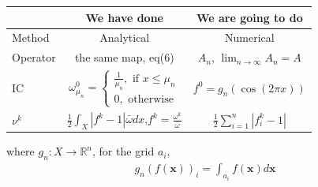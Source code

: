 \documentclass[dvips,landscape]{foils}
\renewcommand{\oursection}[1]{
\foilhead[-1.0cm]{#1}
}
\begin{document}
\newpage
\oursection{A Chart}
\renewcommand{\arraystretch}{1.3}
\begin{tabular}{l|cc}

                      & We have done                    & We are going to do     \\
\hline
        Method        & Analytical                      & Numerical    \\
\hline
        Operator      & the same map, eq(6)                  & $A_n$, $\lim_{n \rightarrow \infty} A_n = A$ \\
\hline
        IC            &  $\omega_{\mu_n}^0 = \left\{ \begin{array}{c}
                                     \frac{1}{\mu_n}, \mbox{  if  } x \le \mu_n\\ 
                      0, \mbox{  otherwise} 
                      \end{array}\right.$
                                                          & $f^0 = g_n(\cos(2 \pi x))$ \\
\hline
$\nu^k$               &  $\frac{1}{2}\int_X |f^k-1|\bar{\omega}dx$,$f^k= \frac{\omega^k}{\bar{\omega}}$
                    
                                                        &   $\frac{1}{2}\sum_{i=1}^n |f^k_i-1|$

  
\end{tabular}

where $g_n: X \rightarrow \mathbb{R}^n$, for the grid $a_i$,
\begin{eqnarray}
  g_n(f(\mathbf{x}))_i = \int_{a_i} f(\mathbf{x}) d\mathbf{x}
\end{eqnarray}
\end{document}
